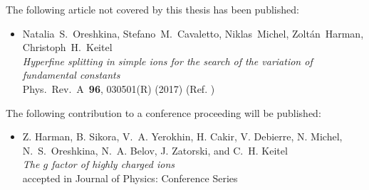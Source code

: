 \noindent
The following article not covered by this thesis has been published:

\begin{itemize}
\item Natalia~S.~Oreshkina, Stefano~M.~Cavaletto, Niklas~Michel, Zoltán~Harman,\\Christoph~H.~Keitel \\ 
\textit{Hyperfine splitting in simple ions for the search of the variation of fundamental constants} \\ 
Phys.~Rev.~A~\textbf{96}, 030501(R) (2017) (Ref. \cite{oreshkina2017}) \vspace*{1pt} \\
\end{itemize} 

\noindent
The following contribution to a conference proceeding will be published:

\begin{itemize}
\item Z. Harman, B. Sikora, V.~A. Yerokhin, H. Cakir, V. Debierre, N. Michel, N.~S.~Oreshkina, N.~A. Belov, J. Zatorski, and C.~H. Keitel \\ 
\textit{The $g$ factor of highly charged ions} \\
accepted in Journal of Physics: Conference Series
\end{itemize} 

\thispagestyle{empty}
